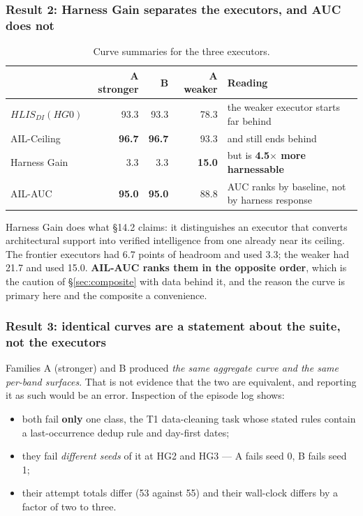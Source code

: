 \documentclass[11pt]{article}
\theoremstyle{definition}
\begin{document}
\subsubsection{Result 2: Harness Gain separates the executors, and AUC does not}

\begin{table}[!htbp]
\centering\small
\begin{tabularx}{\textwidth}{@{}lrrrY@{}}
\toprule
& A stronger & B & A weaker & Reading \\
\midrule
$HLIS_{DI}(HG0)$ & 93.3 & 93.3 & 78.3 & the weaker executor starts far behind \\
AIL-Ceiling & \textbf{96.7} & \textbf{96.7} & 93.3 & and still ends behind \\
Harness Gain & 3.3 & 3.3 & \textbf{15.0} & but is \textbf{4.5$\times$ more harnessable} \\
AIL-AUC & \textbf{95.0} & \textbf{95.0} & 88.8 & AUC ranks by baseline, not by harness response \\
\bottomrule
\end{tabularx}
\caption{Curve summaries for the three executors.}
\label{tab:curvesummary}
\end{table}

Harness Gain does what \S14.2 claims: it distinguishes an executor that converts architectural support into verified intelligence from one already near its ceiling. The frontier executors had 6.7 points of headroom and used 3.3; the weaker had 21.7 and used 15.0. \textbf{AIL-AUC ranks them in the opposite order}, which is the caution of \S\ref{sec:composite} with data behind it, and the reason the curve is primary here and the composite a convenience.

\subsubsection{Result 3: identical curves are a statement about the suite, not the executors}

Families A (stronger) and B produced \emph{the same aggregate curve and the same per-band surfaces}. That is not evidence that the two are equivalent, and reporting it as such would be an error. Inspection of the episode log shows:

\begin{itemize}
\item both fail \textbf{only} one class, the T1 data-cleaning task whose stated rules contain a last-occurrence dedup rule and day-first dates;
\item they fail \emph{different seeds} of it at HG2 and HG3 --- A fails seed 0, B fails seed 1;
\item their attempt totals differ (53 against 55) and their wall-clock differs by a factor of two to three.
\end{itemize}
\end{document}
